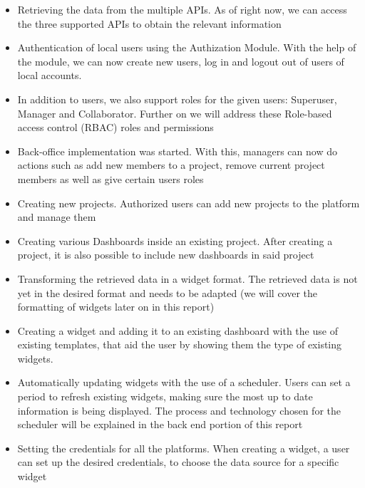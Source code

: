 \documentclass[a4paper,twoside,10pt]{report}
\begin{document}
\begin{itemize}
     \item Retrieving the data from the multiple APIs. As of right now, we can access the three supported APIs to obtain the relevant information
    
     \item Authentication of local users using the Authization Module. With the help of the module, we can now create new users, log in and logout out of users of local accounts.
    
     \item In addition to users, we also support roles for the given users: Superuser, Manager and Collaborator. Further on we will address these Role-based access control\cite{RBAC} (RBAC) roles and permissions
    
     \item Back-office implementation was started. With this, managers can now do actions such as add new members to a project, remove current project members as well as give certain users roles

     \item Creating new projects. Authorized users can add new projects to the platform and manage them

     \item Creating various Dashboards inside an existing project. After creating a project, it is also possible to include new dashboards in said project

     \item Transforming the retrieved data in a widget format. The retrieved data is not yet in the desired format and needs to be adapted (we will cover the formatting of widgets later on in this report)

     \item Creating a widget and adding it to an existing dashboard with the use of existing templates, that aid the user by showing them the type of existing widgets.

     \item Automatically updating widgets with the use of a scheduler. Users can set a period to refresh existing widgets, making sure the most up to date information is being displayed. The process and technology chosen for the scheduler will be explained in the back end portion of this report

     \item Setting the credentials for all the platforms. When creating a widget, a user can set up the desired credentials, to choose the data source for a specific widget
\end{itemize}
\end{document}
